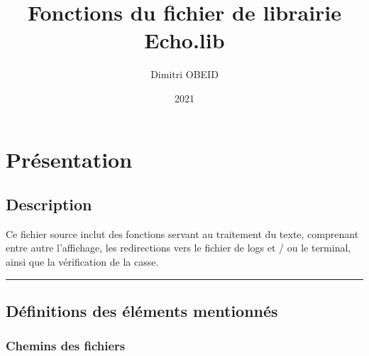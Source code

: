 \documentclass[a4paper,10pt]{article}
\title{\color{sec1}Fonctions du fichier de librairie \color{path}Echo.lib}\color{text}
\author{Dimitri OBEID}
\date{2021}
\begin{document}
\maketitle
\newpage

\hypertarget{contents}{}
\tableofcontents
\newpage

\color{sec1}
\section{Présentation}\color{text}

\color{sec2}
\subsection{Description}\color{text}

\begin{justify}
    Ce fichier source inclut des fonctions servant au traitement du texte, comprenant entre autre l'affichage, les redirections vers le fichier de logs et / ou le terminal, ainsi que la vérification de la casse.
\end{justify}




\color{sec2}\par\noindent\rule{\textwidth}{0.4pt}\color{text}

\color{sec2}
\subsection{Définitions des éléments mentionnés}\color{text}

\color{sec3}
\subsubsection{Chemins des fichiers}\color{text}
\end{document}
